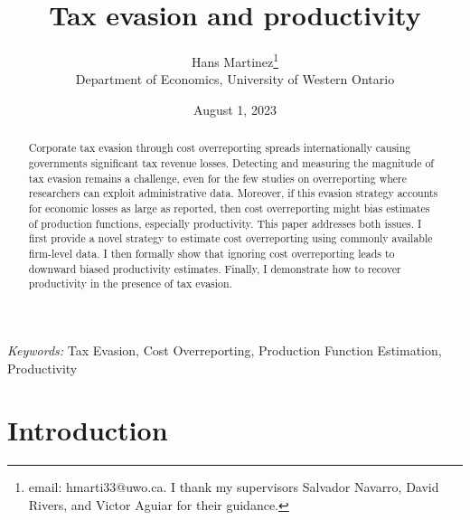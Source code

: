 \documentclass[
  12pt]{article}
\theoremstyle{definition}
\theoremstyle{remark}
\begin{document}
\def\spacingset#1{\renewcommand{\baselinestretch}%
{#1}\small\normalsize} \spacingset{1}



\date{August 1, 2023}
\title{\bf Tax evasion and productivity}
\author{
Hans Martinez\thanks{email: hmarti33@uwo.ca. I thank my supervisors
Salvador Navarro, David Rivers, and Victor Aguiar for their guidance.}\\
Department of Economics, University of Western Ontario\\
}
\maketitle

\bigskip
\bigskip
\begin{abstract}
Corporate tax evasion through cost overreporting spreads internationally
causing governments significant tax revenue losses. Detecting and
measuring the magnitude of tax evasion remains a challenge, even for the
few studies on overreporting where researchers can exploit
administrative data. Moreover, if this evasion strategy accounts for
economic losses as large as reported, then cost overreporting might bias
estimates of production functions, especially productivity. This paper
addresses both issues. I first provide a novel strategy to estimate cost
overreporting using commonly available firm-level data. I then formally
show that ignoring cost overreporting leads to downward biased
productivity estimates. Finally, I demonstrate how to recover
productivity in the presence of tax evasion.
\end{abstract}

\noindent%
{\it Keywords:} Tax Evasion, Cost Overreporting, Production Function
Estimation, Productivity
\vfill

\newpage
\spacingset{1.9} %
\ifdefined\Shaded\renewenvironment{Shaded}{\begin{tcolorbox}[borderline west={3pt}{0pt}{shadecolor}, boxrule=0pt, enhanced, breakable, frame hidden, interior hidden, sharp corners]}{\end{tcolorbox}}\fi

\hypertarget{introduction}{%
\section*{Introduction}\label{introduction}}
\end{document}
